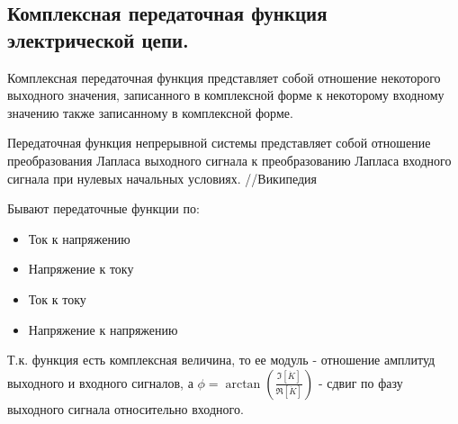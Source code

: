 \subsection{Комплексная передаточная функция электрической цепи.}

Комплексная передаточная функция представляет собой отношение некоторого выходного значения, записанного в комплексной форме к некоторому входному значению также записанному в комплексной форме.

 Передаточная функция непрерывной системы представляет собой отношение преобразования Лапласа выходного сигнала к преобразованию Лапласа входного сигнала при нулевых начальных условиях. //Википедия

Бывают передаточные функции по:

\begin{itemize}
\item
Ток к напряжению
\item
Напряжение к току
\item
Ток к току
\item
Напряжение к напряжению
\end{itemize}

Т.к. функция есть комплексная величина, то ее модуль - отношение амплитуд выходного и входного сигналов, а $\phi = \arctan(\frac{\Im[\dot K]}{\Re[\dot K]})$ - сдвиг по фазу выходного сигнала относительно входного.

\pagebreak